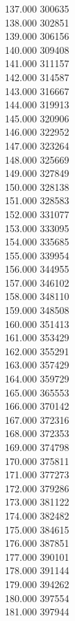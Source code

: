 { 137.000	300635 \\
 138.000	302851 \\
 139.000	306156 \\
 140.000	309408 \\
 141.000	311157 \\
 142.000	314587 \\
 143.000	316667 \\
 144.000	319913 \\
 145.000	320906 \\
 146.000	322952 \\
 147.000	323264 \\
 148.000	325669 \\
 149.000	327849 \\
 150.000	328138 \\
 151.000	328583 \\
 152.000	331077 \\
 153.000	333095 \\
 154.000	335685 \\
 155.000	339954 \\
 156.000	344955 \\
 157.000	346102 \\
 158.000	348110 \\
 159.000	348508 \\
 160.000	351413 \\
 161.000	353429 \\
 162.000	355291 \\
 163.000	357429 \\
 164.000	359729 \\
 165.000	365553 \\
 166.000	370142 \\
 167.000	372316 \\
 168.000	372353 \\
 169.000	374798 \\
 170.000	375811 \\
 171.000	377273 \\
 172.000	379286 \\
 173.000	381122 \\
 174.000	382482 \\
 175.000	384615 \\
 176.000	387851 \\
 177.000	390101 \\
 178.000	391144 \\
 179.000	394262 \\
 180.000	397554 \\
 181.000	397944 \\
}
